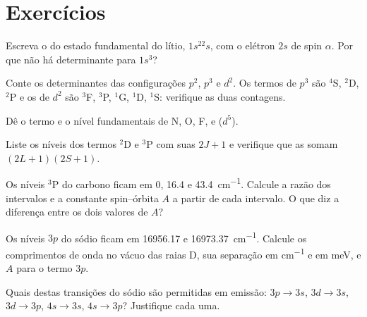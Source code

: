 \section{Exercícios}

\begin{exercise}[$\star$]\label{exo:b3:many-electron-atoms:1}
Escreva o  do estado fundamental do lítio, $1s^22s$,
com o elétron $2s$ de spin $\alpha$. Por que não há determinante para
$1s^3$?
\end{exercise}

\begin{exercise}[$\star$]\label{exo:b3:many-electron-atoms:2}
Conte os determinantes das configurações $p^2$, $p^3$ e $d^2$. Os termos
de $p^3$ são ${}^4$S, ${}^2$D, ${}^2$P e os de $d^2$ são ${}^3$F, ${}^3$P, ${}^1$G,
${}^1$D, ${}^1$S: verifique as duas contagens.
\end{exercise}

\begin{exercise}[$\star$]\label{exo:b3:many-electron-atoms:3}
Dê o termo e o nível fundamentais de N, O, F,  e  ($d^5$).
\end{exercise}

\begin{exercise}[$\star$]\label{exo:b3:many-electron-atoms:4}
Liste os níveis dos termos ${}^2$D e ${}^3$P com suas  $2J+1$
e verifique que as  somam $(2L+1)(2S+1)$.
\end{exercise}

\begin{exercise}[$\star\star$]\label{exo:b3:many-electron-atoms:5}
Os níveis ${}^3$P do carbono ficam em 0, 16.4 e \qty{43.4}{cm^{-1}}. Calcule a
razão dos intervalos e a constante spin--órbita $A$ a partir de cada intervalo.
O que diz a diferença entre os dois valores de $A$?
\end{exercise}

\begin{exercise}[$\star\star$]\label{exo:b3:many-electron-atoms:6}
Os níveis $3p$ do sódio ficam em 16956.17 e \qty{16973.37}{cm^{-1}}. Calcule
os comprimentos de onda no vácuo das raias D, sua separação em \unit{cm^{-1}} e
em meV, e $A$ para o termo $3p$.
\end{exercise}

\begin{exercise}[$\star\star$]\label{exo:b3:many-electron-atoms:7}
Quais destas transições do sódio são permitidas em emissão: $3p \to 3s$,
$3d \to 3s$, $3d \to 3p$, $4s \to 3s$, $4s \to 3p$? Justifique cada uma.
\end{exercise}

